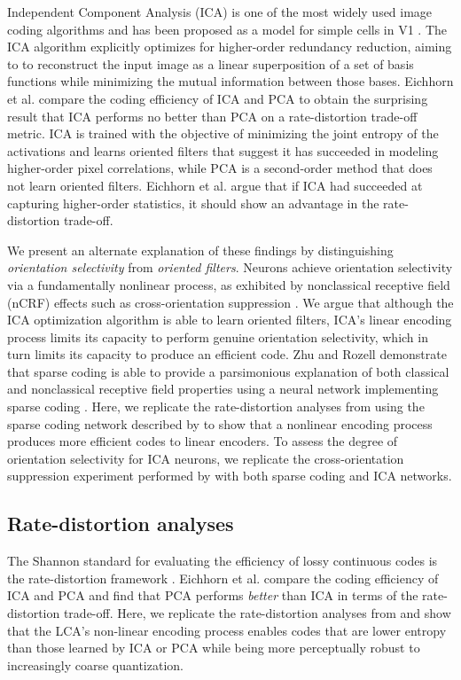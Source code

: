 Independent Component Analysis (ICA) is one of the most widely used image coding algorithms and has been proposed as a model for simple cells in V1 \parencite{bell1997independent}. The ICA algorithm explicitly optimizes for higher-order redundancy reduction, aiming to to reconstruct the input image as a linear superposition of a set of basis functions while minimizing the mutual information between those bases. Eichhorn et al. \citeyearpar{eichhorn2009natural} compare the  coding efficiency of ICA and PCA to obtain the surprising result that ICA performs no better than PCA on a rate-distortion trade-off metric. ICA is trained with the objective of minimizing the joint entropy of the activations and learns oriented filters that suggest it has succeeded in modeling higher-order pixel correlations, while PCA is a second-order method that does not learn oriented filters. Eichhorn et al. \citeyearpar{eichhorn2009natural} argue that if ICA had succeeded at capturing higher-order statistics, it should show an advantage in the rate-distortion trade-off.

We present an alternate explanation of these findings by distinguishing \textit{orientation selectivity} from \textit{oriented filters}. Neurons achieve orientation selectivity via a fundamentally nonlinear process, as exhibited by nonclassical receptive field (nCRF) effects such as cross-orientation suppression \parencite{golden2016conjectures, zhu2013visual}. We argue that although the ICA optimization algorithm is able to learn oriented filters, ICA's linear encoding process limits its capacity to perform genuine orientation selectivity, which in turn limits its capacity to produce an efficient code. Zhu and Rozell \citeyearpar{zhu2013visual} demonstrate that sparse coding is able to provide a parsimonious explanation of both classical and nonclassical receptive field properties using a neural network implementing sparse coding \parencite{zhu2013visual}. Here, we replicate the rate-distortion analyses from \parencite{eichhorn2009natural} using the sparse coding network described by \parencite{zhu2013visual} to show that a nonlinear encoding process produces more efficient codes to linear encoders. To assess the degree of orientation selectivity for ICA neurons, we replicate the cross-orientation suppression experiment performed by \parencite{zhu2013visual} with both sparse coding and ICA networks.


\subsection{Rate-distortion analyses}
The Shannon standard for evaluating the efficiency of lossy continuous codes is the rate-distortion framework \parencite{cover2012elements}. Eichhorn et al. \citeyearpar{eichhorn2009natural} compare the  coding efficiency of ICA and PCA and find that PCA performs \textit{better} than ICA in terms of the rate-distortion trade-off. Here, we replicate the rate-distortion analyses from \parencite{eichhorn2009natural} and show that the LCA's non-linear encoding process enables codes that are lower entropy than those learned by ICA or PCA while being more perceptually robust to increasingly coarse quantization.

